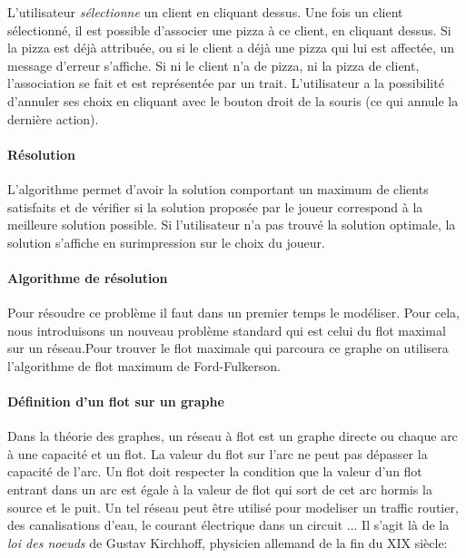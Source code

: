 		L'utilisateur \emph{sélectionne} un client en cliquant dessus.
		    Une fois un client sélectionné, il est possible
		    d'associer une pizza à ce client, en cliquant dessus.
		    Si la pizza est déjà attribuée, ou si le client a déjà
		    une pizza qui lui est affectée, un message d'erreur s'affiche.
		    Si ni le client n'a de pizza, ni la pizza de client, l'association
		    se fait et est représentée par un trait.
		L'utilisateur a la possibilité d'annuler ses choix en cliquant avec le bouton
		    droit de la souris (ce qui annule la dernière action).
		\paragraph{Résolution}
			L'algorithme permet d'avoir la solution comportant un maximum de clients
			 satisfaits et de vérifier si la solution proposée par le joueur correspond
			 à la meilleure solution possible.
 			Si l'utilisateur n'a pas trouvé la solution optimale, la solution s'affiche
			 en surimpression sur le choix du joueur.
            

		\paragraph{Algorithme de résolution}
			Pour résoudre ce problème il faut dans un premier temps le modéliser.
            Pour cela, nous introduisons un nouveau problème standard qui est celui du flot maximal sur un
            réseau.Pour trouver le flot maximale qui parcoura ce graphe on utilisera l'algorithme de flot
             maximum de Ford-Fulkerson.

        \paragraph{Définition d’un flot sur un graphe}

	    Dans la théorie des graphes, un réseau à flot est un graphe directe ou chaque arc à une capacité et un flot. 
	    La valeur du flot sur l'arc ne peut pas dépasser la capacité de l'arc. Un flot doit respecter la condition que la valeur d'un flot entrant dans un arc 
	    est égale à la valeur de flot qui sort de cet arc hormis la source et le puit. Un tel réseau peut être utilisé pour modeliser un traffic routier, des canalisations d'eau,
	    le courant électrique dans un circuit ...
	    Il s'agit là de la \emph{loi des noeuds} de Gustav Kirchhoff, physicien allemand de la fin du XIX siècle:


